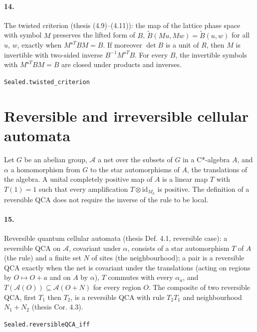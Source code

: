 \documentclass[11pt]{article}
\begin{document}
\paragraph{14.} The twisted criterion (thesis (4.9)–(4.11)): the map of the lattice phase space with symbol $M$ preserves the lifted form of $B$, $\tilde B(M u, M w) = \tilde B(u, w)$ for all $u$, $w$, exactly when $M^{\star T} B M = B$. If moreover $\det B$ is a unit of $R$, then $M$ is invertible with two-sided inverse $B^{-1} M^{\star T} B$. For every $B$, the invertible symbols with $M^{\star T} B M = B$ are closed under products and inverses.\par{\footnotesize\texttt{Sealed.twisted\_criterion}}

\section*{Reversible and irreversible cellular automata}
Let $G$ be an abelian group, $\mathcal A$ a net over the subsets of $G$ in a C*-algebra $A$, and $\alpha$ a homomorphism from $G$ to the star automorphisms of $A$, the translations of the algebra. A unital completely positive map of $A$ is a linear map $T$ with $T(1) = 1$ such that every amplification $T \otimes \mathrm{id}_{M_k}$ is positive. The definition of a reversible QCA does not require the inverse of the rule to be local.

\paragraph{15.} Reversible quantum cellular automata (thesis Def. 4.1, reversible case): a reversible QCA on $\mathcal A$, covariant under $\alpha$, consists of a star automorphism $T$ of $A$ (the rule) and a finite set $N$ of sites (the neighbourhood); a pair is a reversible QCA exactly when the net is covariant under the translations (acting on regions by $O \mapsto O + a$ and on $A$ by $\alpha$), $T$ commutes with every $\alpha_a$, and $T(\mathcal A(O)) \subseteq \mathcal A(O + N)$ for every region $O$. The composite of two reversible QCA, first $T_1$ then $T_2$, is a reversible QCA with rule $T_2 T_1$ and neighbourhood $N_1 + N_2$ (thesis Cor. 4.3).\par{\footnotesize\texttt{Sealed.reversibleQCA\_iff}}
\end{document}
